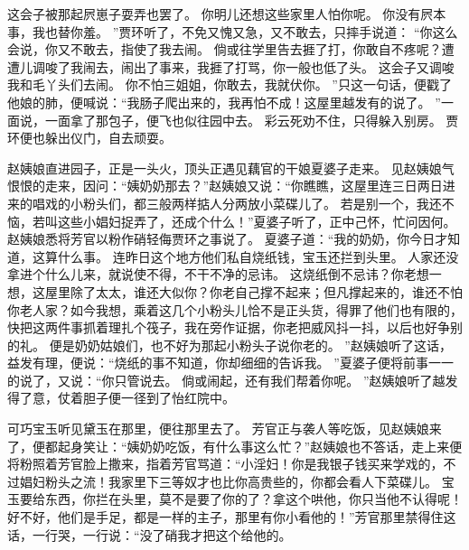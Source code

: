 这会子被那起屄崽子耍弄也罢了。
你明儿还想这些家里人怕你呢。
你没有屄本事，我也替你羞。
”贾环听了，不免又愧又急，又不敢去，只摔手说道：
“你这么会说，你又不敢去，指使了我去闹。
倘或往学里告去捱了打，你敢自不疼呢？遭遭儿调唆了我闹去，闹出了事来，我捱了打骂，你一般也低了头。
这会子又调唆我和毛丫头们去闹。
你不怕三姐姐，你敢去，我就伏你。
”只这一句话，便戳了他娘的肺，便喊说：“我肠子爬出来的，我再怕不成！这屋里越发有的说了。
”一面说，一面拿了那包子，便飞也似往园中去。
彩云死劝不住，只得躲入别房。
贾环便也躲出仪门，自去顽耍。
\par
赵姨娘直进园子，正是一头火，顶头正遇见藕官的干娘夏婆子走来。
见赵姨娘气恨恨的走来，因问：“姨奶奶那去？”赵姨娘又说：“你瞧瞧，这屋里连三日两日进来的唱戏的小粉头们，都三般两样掂人分两放小菜碟儿了。
若是别一个，我还不恼，若叫这些小娼妇捉弄了，还成个什么！”夏婆子听了，正中己怀，忙问因何。
赵姨娘悉将芳官以粉作硝轻侮贾环之事说了。
夏婆子道：“我的奶奶，你今日才知道，这算什么事。
连昨日这个地方他们私自烧纸钱，宝玉还拦到头里。
人家还没拿进个什么儿来，就说使不得，不干不净的忌讳。
这烧纸倒不忌讳？你老想一想，这屋里除了太太，谁还大似你？你老自己撑不起来；但凡撑起来的，谁还不怕你老人家？如今我想，乘着这几个小粉头儿恰不是正头货，得罪了他们也有限的，快把这两件事抓着理扎个筏子，我在旁作证据，你老把威风抖一抖，以后也好争别的礼。
便是奶奶姑娘们，也不好为那起小粉头子说你老的。
”赵姨娘听了这话，益发有理，便说：“烧纸的事不知道，你却细细的告诉我。
”夏婆子便将前事一一的说了，又说：“你只管说去。
倘或闹起，还有我们帮着你呢。
”赵姨娘听了越发得了意，仗着胆子便一径到了怡红院中。
\par
可巧宝玉听见黛玉在那里，便往那里去了。
芳官正与袭人等吃饭，见赵姨娘来了，便都起身笑让：“姨奶奶吃饭，有什么事这么忙？”赵姨娘也不答话，走上来便将粉照着芳官脸上撒来，指着芳官骂道：“小淫妇！你是我银子钱买来学戏的，不过娼妇粉头之流！我家里下三等奴才也比你高贵些的，你都会看人下菜碟儿。
宝玉要给东西，你拦在头里，莫不是要了你的了？拿这个哄他，你只当他不认得呢！好不好，他们是手足，都是一样的主子，那里有你小看他的！”芳官那里禁得住这话，一行哭，一行说：“没了硝我才把这个给他的。
